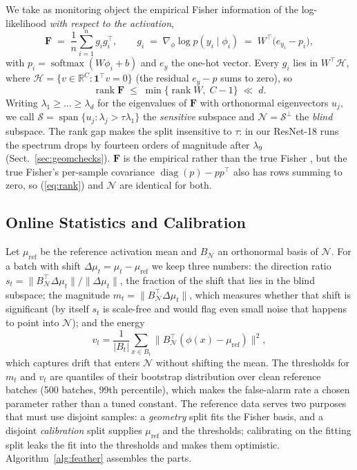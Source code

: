 \documentclass[graybox]{SNmult}
\newcommand{\R}{\mathbb{R}}
\newcommand{\F}{\mathbf{F}}
\newcommand{\act}{\phi}
\DeclareMathOperator{\rank}{rank}
\DeclareMathOperator{\diag}{diag}
\DeclareMathOperator{\spn}{span}
\DeclareMathOperator*{\softmax}{softmax}
\begin{document}
We take as monitoring object the empirical Fisher information of the
log-likelihood \emph{with respect to the activation},
\begin{equation}
  \F \;=\; \frac{1}{n}\sum_{i=1}^{n} g_i g_i^\top,
  \qquad
  g_i \;=\; \nabla_{\act}\log p(y_i \mid \act_i)
        \;=\; W^\top\!\big(e_{y_i} - p_i\big),
  \label{eq:fisher}
\end{equation}
with $p_i = \softmax(W\act_i + b)$ and $e_y$ the one-hot vector. Every $g_i$
lies in $W^\top\!\mathcal{H}$, where
$\mathcal{H} = \{v \in \R^C : \mathbf{1}^\top v = 0\}$ (the residual
$e_y - p$ sums to zero), so
\begin{equation}
  \rank \F \;\le\; \min\{\rank W,\; C-1\} \;\ll\; d .
  \label{eq:rank}
\end{equation}
Writing $\lambda_1 \ge \dots \ge \lambda_d$ for the eigenvalues of $\F$ with
orthonormal eigenvectors $u_j$, we call
$\mathcal{S} = \spn\{u_j : \lambda_j > \tau\lambda_1\}$ the \emph{sensitive}
subspace and $\mathcal{N} = \mathcal{S}^\perp$ the \emph{blind} subspace. The
rank gap makes the split insensitive to $\tau$: in our ResNet-18 runs the
spectrum drops by fourteen orders of magnitude after $\lambda_9$
(Sect.~\ref{sec:geomchecks}). $\F$ is the empirical rather than the true Fisher \cite{kunstner2019empirical},
but the true Fisher's per-sample covariance $\diag(p) - pp^\top$ also has rows
summing to zero, so (\ref{eq:rank}) and $\mathcal{N}$ are identical for both.

\subsection{Online Statistics and Calibration}
\label{sec:stats}

Let $\mu_{\mathrm{ref}}$ be the reference activation mean and $B_\mathcal{N}$
an orthonormal basis of $\mathcal{N}$. For a batch with shift
$\Delta\mu_t = \mu_t - \mu_{\mathrm{ref}}$ we keep three numbers: the
direction ratio
$s_t = \lVert B_\mathcal{N}^\top \Delta\mu_t\rVert / \lVert \Delta\mu_t\rVert$,
the fraction of the shift that lies in the blind subspace; the
magnitude $m_t = \lVert B_\mathcal{N}^\top \Delta\mu_t\rVert$, which
measures whether that shift is significant (by itself $s_t$ is scale-free and
would flag even small noise that happens to point into $\mathcal{N}$); and the
energy
\begin{equation}
  v_t = \frac{1}{|B_t|}\sum_{x \in B_t}
        \big\lVert B_\mathcal{N}^\top(\act(x) - \mu_{\mathrm{ref}})\big\rVert^2,
\end{equation}
which captures drift that enters $\mathcal{N}$ without shifting the mean.
The thresholds for $m_t$ and $v_t$ are quantiles of their bootstrap
distribution over clean reference batches (500 batches, 99th percentile), which
makes the false-alarm rate a chosen parameter rather than a tuned constant.
The reference data serves two purposes that must use disjoint samples: a
\emph{geometry} split fits the Fisher basis, and a disjoint \emph{calibration}
split supplies $\mu_{\mathrm{ref}}$ and the thresholds; calibrating on the fitting
split leaks the fit into the thresholds and makes them optimistic.
Algorithm~\ref{alg:feather} assembles the parts.
\end{document}
